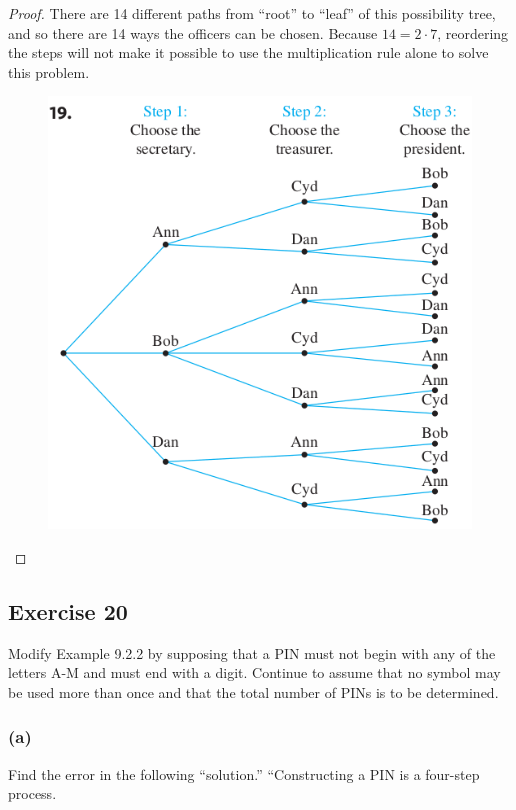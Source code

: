 \documentclass[14pt]{extarticle}
\begin{document}
\begin{proof}
There are 14 different paths from “root” to “leaf” of this possibility tree, and so there are 14 ways the officers can 
be chosen. Because \(14 = 2\cdot7\), reordering the steps will not make it possible to use the multiplication rule 
alone to solve this problem.

\begin{figure}[ht!]
\centering
\includegraphics[scale=0.45]{../images/9.2.19.png}
\end{figure}
\end{proof}

\subsection{Exercise 20}
Modify Example 9.2.2 by supposing that a PIN must not begin with any of the letters A-M and must end with a digit. Continue to assume that no symbol may be used more than once and that the total number of PINs is to be determined.

\subsubsection{(a)}
Find the error in the following “solution.” “Constructing a PIN is a four-step process. 
\end{document}
